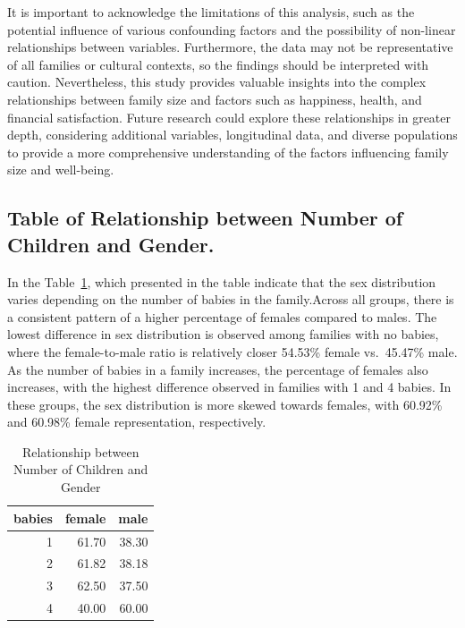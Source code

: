 \documentclass[
  letterpaper,
  DIV=11,
  numbers=noendperiod]{scrartcl}
\begin{document}
It is important to acknowledge the limitations of this analysis, such as
the potential influence of various confounding factors and the
possibility of non-linear relationships between variables. Furthermore,
the data may not be representative of all families or cultural contexts,
so the findings should be interpreted with caution. Nevertheless, this
study provides valuable insights into the complex relationships between
family size and factors such as happiness, health, and financial
satisfaction. Future research could explore these relationships in
greater depth, considering additional variables, longitudinal data, and
diverse populations to provide a more comprehensive understanding of the
factors influencing family size and well-being.

\hypertarget{table-of-relationship-between-number-of-children-and-gender.}{%
\subsection{Table of Relationship between Number of Children and
Gender.}\label{table-of-relationship-between-number-of-children-and-gender.}}

In the Table~\ref{tbl-sex}, which presented in the table indicate that
the sex distribution varies depending on the number of babies in the
family.Across all groups, there is a consistent pattern of a higher
percentage of females compared to males. The lowest difference in sex
distribution is observed among families with no babies, where the
female-to-male ratio is relatively closer 54.53\% female vs.~45.47\%
male. As the number of babies in a family increases, the percentage of
females also increases, with the highest difference observed in families
with 1 and 4 babies. In these groups, the sex distribution is more
skewed towards females, with 60.92\% and 60.98\% female representation,
respectively.

\hypertarget{tbl-sex}{}
\begin{table}
\caption{\label{tbl-sex}Relationship between Number of Children and Gender }\tabularnewline

\centering
\begin{tabular}{r|r|r}
\hline
babies & female & male\\
\hline
1 & 61.70 & 38.30\\
\hline
2 & 61.82 & 38.18\\
\hline
3 & 62.50 & 37.50\\
\hline
4 & 40.00 & 60.00\\
\hline
\end{tabular}
\end{table}
\end{document}
